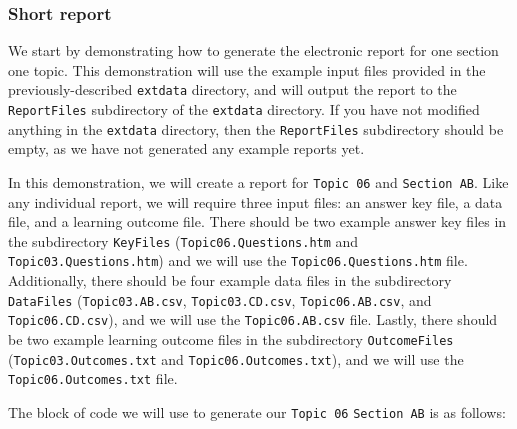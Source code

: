 \documentclass{article}\usepackage[]{graphicx}\usepackage[]{color}
\numberwithin{equation}{section} %
\begin{document}
\subsubsection{Short report}

We start by demonstrating how to generate the electronic report for one section one topic. This demonstration will use the example input files provided in the previously-described \texttt{extdata} directory, and will output the report to the \texttt{ReportFiles} subdirectory of the \texttt{extdata} directory. If you have not modified anything in the \texttt{extdata} directory, then the \texttt{ReportFiles} subdirectory should be empty, as we have not generated any example reports yet.

In this demonstration, we will create a report for \texttt{Topic 06} and \texttt{Section AB}. Like any individual report, we will require three input files: an answer key file, a data file, and a learning outcome file. There should be two example answer key files in the subdirectory \texttt{KeyFiles} (\texttt{Topic06.Questions.htm} and \texttt{Topic03.Questions.htm}) and we will use the \texttt{Topic06.Questions.htm} file. Additionally, there should be four example data files in the subdirectory \texttt{DataFiles} (\texttt{Topic03.AB.csv}, \texttt{Topic03.CD.csv}, \texttt{Topic06.AB.csv}, and \texttt{Topic06.CD.csv}), and we will use the \texttt{Topic06.AB.csv} file. Lastly, there should be two example learning outcome files in the subdirectory \texttt{OutcomeFiles} (\texttt{Topic03.Outcomes.txt} and \texttt{Topic06.Outcomes.txt}), and we will use the \texttt{Topic06.Outcomes.txt} file.

The block of code we will use to generate our \texttt{Topic 06} \texttt{Section AB} is as follows:
\end{document}
